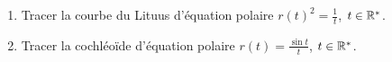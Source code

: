 \begin{frame}[fragile]


\begin{tp}
\begin{enumerate}
  \item Tracer la courbe du Lituus d'équation polaire 
  $r(t)^2 = \frac{1}{t}$, $t \in \mathbb{R}^*$.
  \item Tracer la cochléoïde d'équation polaire 
	  $r(t) = \frac{\sin t}{t}$, $t \in \mathbb{R}^*$.
\end{enumerate} 
\end{tp}


\begin{center}
\begin{minipage}{0.45\textwidth}
\end{minipage}\ 
\begin{minipage}{0.49\textwidth}
\end{minipage}
\end{center}
\end{frame}



